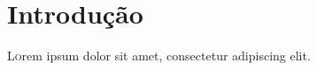 \section{Introdução}

\lettrine[nindent=0em,lines=3]{L} orem ipsum dolor sit amet, consectetur adipiscing elit.
\lipsum[2-3] %
